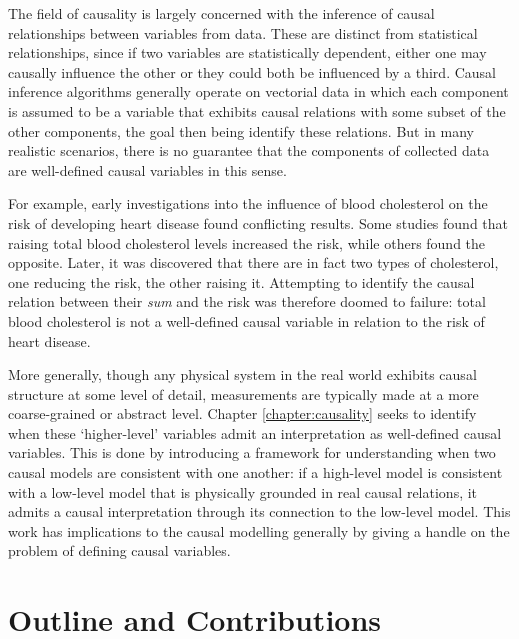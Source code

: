 The field of causality is largely concerned with the inference of causal relationships between variables from data. 
These are distinct from statistical relationships, since if two variables are statistically dependent, either one may causally influence the other or they could both be influenced by a third.
Causal inference algorithms generally operate on vectorial data in which each component is assumed to be a variable that exhibits causal relations with some subset of the other components, the goal then being identify these relations.
But in many realistic scenarios, there is no guarantee that the components of collected data are well-defined causal variables in this sense.

For example, early investigations into the influence of blood cholesterol on the risk of developing heart disease found conflicting results.
Some studies found that raising total blood cholesterol levels increased the risk, while others found the opposite. 
Later, it was discovered that there are in fact two types of cholesterol, one reducing the risk, the other raising it. 
Attempting to identify the causal relation between their \emph{sum} and the risk was therefore doomed to failure: total blood cholesterol is not a well-defined causal variable in relation to the risk of heart disease.

More generally, though any physical system in the real world exhibits causal structure at some level of detail, measurements are typically made at a more coarse-grained or abstract level. 
Chapter \ref{chapter:causality} seeks to identify when these `higher-level' variables admit an interpretation as well-defined causal variables.
This is done by introducing a framework for understanding when two causal models are consistent with one another: if a high-level model is consistent with a low-level model that is physically grounded in real causal relations, it admits a causal interpretation through its connection to the low-level model.
This work has implications to the causal modelling generally by giving a handle on the problem of defining causal variables. 




\section{Outline and Contributions}

